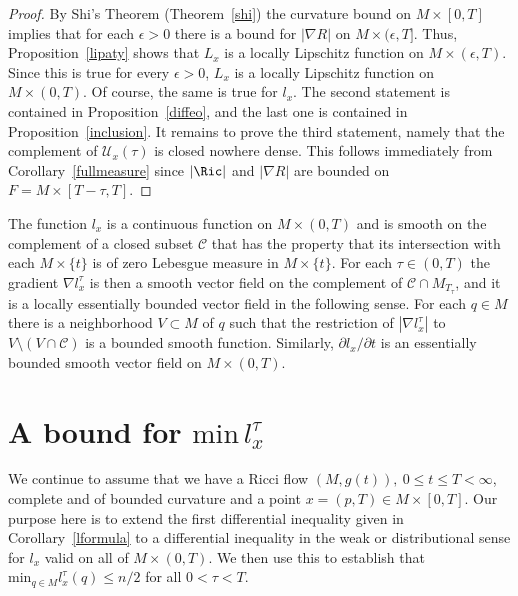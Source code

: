 \begin{proof}
By Shi's Theorem (Theorem~\ref{shi}) the curvature bound on $M\times
[0,T]$ implies that for each $\epsilon>0$ there is a bound for
$|\nabla R|$ on $M\times (\epsilon,T]$. Thus,
Proposition~\ref{lipaty} shows that $L_{x}$ is a
 locally Lipschitz function on $M\times (\epsilon,T)$. Since this is
true for every $\epsilon>0$, $L_x$ is a locally Lipschitz function
on $M\times (0,T)$. Of course, the same is true for $l_{x}$. The
second statement is contained in Proposition~\ref{diffeo}, and the
last one is contained in Proposition~\ref{inclusion}. It remains to
prove the third statement, namely that the complement of ${\mathcal
U}_{x}(\tau)$ is closed nowhere dense. This follows immediately from
Corollary~\ref{fullmeasure} since $|\Ric|$ and $|\nabla R|$ are
bounded on $F=M\times [T-\tau,T]$.
\end{proof}

\begin{corollary}
\label{cor:l-continuous-ae-smooth}
The function $l_x$ is a continuous function on $M\times (0,T)$ and
is smooth on the complement of a closed subset ${\mathcal C}$ that
has the property that its intersection with each $M\times \{t\}$ is
of zero Lebesgue measure in $M\times \{t\}$. For each $\tau\in
(0,T)$ the gradient $\nabla l^\tau_x$ is then a smooth vector field
on the complement of ${\mathcal C}\cap M_{T_\tau}$, and it is a
locally essentially bounded vector field in the following sense. For
each $q\in M$ there is a neighborhood $V\subset M$ of $q$ such that
the restriction of $|\nabla l_x^\tau|$ to $V\setminus\left(V\cap
{\mathcal C}\right)$ is a bounded smooth function. Similarly,
$\partial l_x/\partial t$ is an essentially bounded smooth vector
field on $M\times (0,T)$.
\end{corollary}

\section{A bound for $\mathrm{min}\, l^\tau_x$}

We continue to assume that we have a Ricci flow $(M,g(t)),\ 0\le
t\le T<\infty$, complete and of bounded curvature and a point
$x=(p,T)\in M\times [0,T]$. Our purpose here is to extend the first
differential inequality given in
 Corollary~\ref{lformula} to a differential
inequality in the weak or distributional sense for $l_{x}$ valid on
all of $M\times (0,T)$. We then use this to establish that $\mathrm{min}_{q\in M} l^\tau_{x}(q)\le n/2$ for all $0<\tau<T$.

